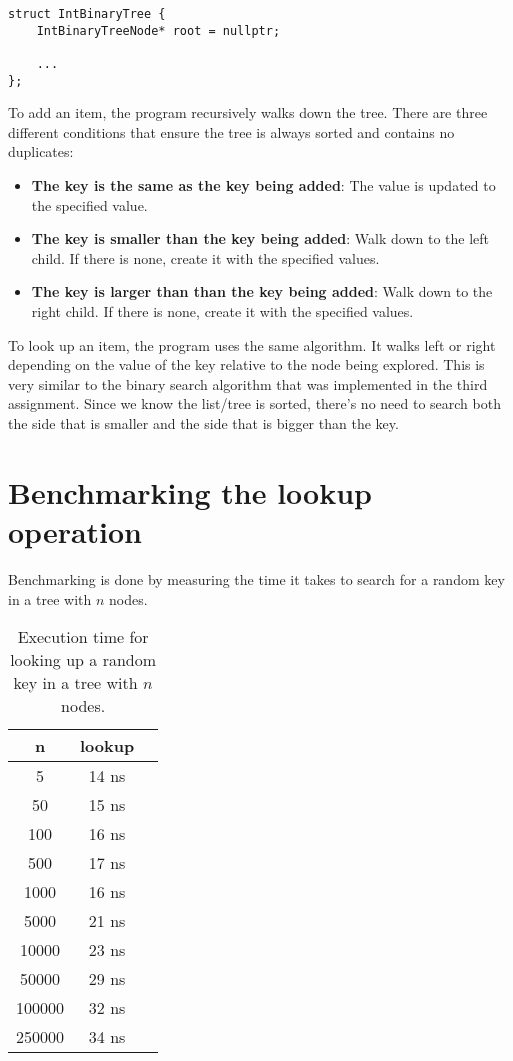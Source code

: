 \documentclass[a4paper,11pt]{article}
\begin{document}
\begin{verbatim}
struct IntBinaryTree {
	IntBinaryTreeNode* root = nullptr;

	...
};
\end{verbatim}

To add an item, the program recursively walks down the tree. There are three different conditions that ensure the tree is always sorted and contains no duplicates:
\begin{itemize}
	\item \textbf{The key is the same as the key being added}: The value is updated to the specified value.
	\item \textbf{The key is smaller than the key being added}: Walk down to the left child. If there is none, create it with the specified values.
	\item \textbf{The key is larger than than the key being added}: Walk down to the right child. If there is none, create it with the specified values.
\end{itemize}

To look up an item, the program uses the same algorithm. It walks left or right depending on the value of the key relative to the node being explored.
This is very similar to the binary search algorithm that was implemented in the third assignment. Since we know the list/tree is sorted, there's no need to search both the side that is smaller and the side that is bigger than the key.

\section*{Benchmarking the lookup operation}

Benchmarking is done by measuring the time it takes to search for a random key in a tree with $n$ nodes.

\begin{table}[H]
\centering
\begin{tabular}{|c|c|c|}
\hline
\textbf{n} & \textbf{lookup} \\
\hline
	5 & 14 ns \\
	50 & 15 ns \\
	100 & 16 ns \\
	500 & 17 ns \\
	1000 & 16 ns \\
	5000 & 21 ns \\
	10000 & 23 ns \\
	50000 & 29 ns \\
	100000 & 32 ns \\
	250000 & 34 ns \\
\hline
\end{tabular}
\caption{Execution time for looking up a random key in a tree with $n$ nodes.}
\label{tab:table1}
\end{table}
\end{document}
